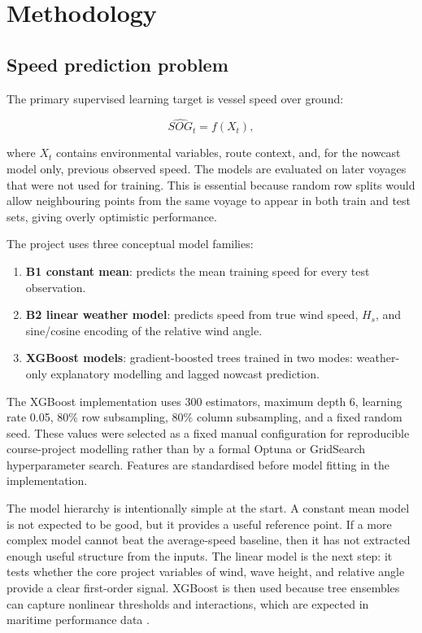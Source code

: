 \documentclass[10pt,a4paper]{article}
\newcommand{\hs}{$H_s$}
\newcommand{\sog}{SOG}
\begin{document}
\section{Methodology}

\subsection{Speed prediction problem}

The primary supervised learning target is vessel speed over ground:

\[
\widehat{\sog}_t = f(X_t),
\]

where $X_t$ contains environmental variables, route context, and, for the
nowcast model only, previous observed speed. The models are evaluated on later
voyages that were not used for training. This is essential because random row
splits would allow neighbouring points from the same voyage to appear in both
train and test sets, giving overly optimistic performance.

The project uses three conceptual model families:

\begin{enumerate}
    \item \textbf{B1 constant mean}: predicts the mean training speed for every
    test observation.
    \item \textbf{B2 linear weather model}: predicts speed from true wind speed,
    \hs{}, and sine/cosine encoding of the relative wind angle.
    \item \textbf{XGBoost models}: gradient-boosted trees trained in two modes:
    weather-only explanatory modelling and lagged nowcast prediction.
\end{enumerate}

The XGBoost implementation uses 300 estimators, maximum depth 6, learning rate
0.05, 80\% row subsampling, 80\% column subsampling, and a fixed random seed.
These values were selected as a fixed manual configuration for reproducible
course-project modelling rather than by a formal Optuna or GridSearch
hyperparameter search. Features are standardised before model fitting in the
implementation.

The model hierarchy is intentionally simple at the start. A constant mean model
is not expected to be good, but it provides a useful reference point. If a more
complex model cannot beat the average-speed baseline, then it has not extracted
enough useful structure from the inputs. The linear model is the next step: it
tests whether the core project variables of wind, wave height, and relative
angle provide a clear first-order signal. XGBoost is then used because tree
ensembles can capture nonlinear thresholds and interactions, which are expected
in maritime performance data \cite{xgboost2016}.
\end{document}
